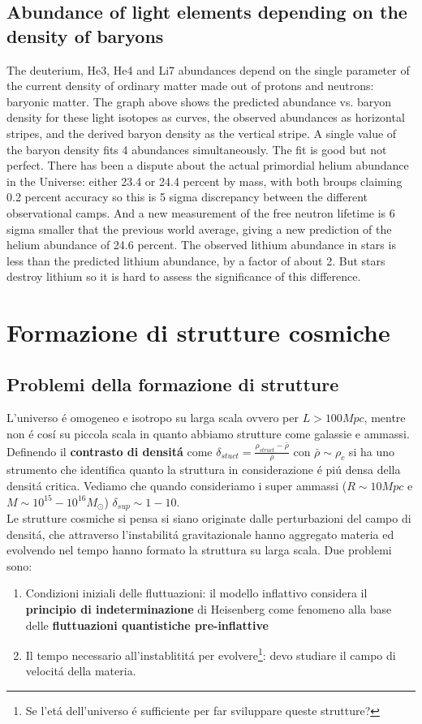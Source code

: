 \documentclass[12pt, a4paper]{article}
\begin{document}
\subsection{Abundance of light elements depending on the density of baryons}
The deuterium, He3, He4 and Li7 abundances depend on the single parameter of the current density of ordinary matter made out of protons and neutrons: baryonic matter. The graph above shows the predicted abundance vs. baryon density for these light isotopes as curves, the observed abundances as horizontal stripes, and the derived baryon density as the vertical stripe. A single value of the baryon density fits 4 abundances simultaneously. The fit is good but not perfect. There has been a dispute about the actual primordial helium abundance in the Universe: either 23.4 or 24.4 percent by mass, with both broups claiming 0.2 percent accuracy so this is 5 sigma discrepancy between the different observational camps. And a new measurement of the free neutron lifetime is 6 sigma smaller that the previous world average, giving a new prediction of the helium abundance of 24.6 percent. The observed lithium abundance in stars is less than the predicted lithium abundance, by a factor of about 2. But stars destroy lithium so it is hard to assess the significance of this difference. 
\newpage
\section{Formazione di strutture cosmiche}
\subsection{Problemi della formazione di strutture}
L'universo \'{e} omogeneo e isotropo su larga scala ovvero per $L>100Mpc$, mentre non \'{e} cos\'{i} su piccola scala in quanto abbiamo strutture come galassie e ammassi. Definendo il \textbf{contrasto di densit\'{a}} come  $\delta_{stuct}=\frac{\rho_{struct}-\bar{\rho}}{\bar{\rho}}$ con $\bar{\rho}\sim \rho_c$ si ha uno strumento che identifica quanto la struttura in considerazione \'{e} pi\'{u} densa della densit\'{a} critica. Vediamo che quando consideriamo i super ammassi ($R\sim 10Mpc$ e $M\sim 10^{15}-10^{16} M_{\odot}$)  $\delta_{sup}\sim 1-10$. \\Le strutture cosmiche si pensa si siano originate dalle perturbazioni del campo di densit\'{a}, che attraverso l'instabilit\'{a} gravitazionale hanno aggregato materia ed evolvendo nel tempo hanno formato la struttura su larga scala. Due problemi sono:
\begin{enumerate}
\item Condizioni iniziali delle fluttuazioni: il modello inflattivo considera il \textbf{principio di indeterminazione} di Heisenberg come fenomeno alla base delle \textbf{fluttuazioni quantistiche pre-inflattive}
\item Il tempo necessario all'instablitit\'{a} per evolvere\footnote{Se l'et\'{a} dell'universo \'{e} sufficiente per far sviluppare queste strutture?}: devo studiare il campo di velocit\'{a} della materia.
\end{enumerate}
\end{document}
